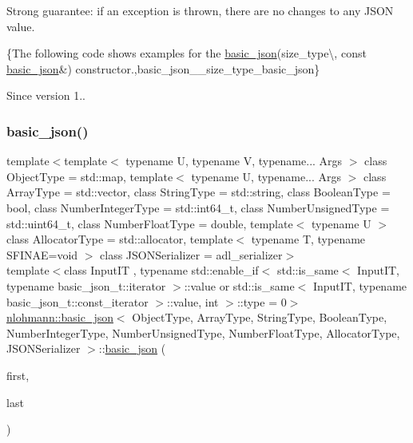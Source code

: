 Strong guarantee\+: if an exception is thrown, there are no changes to any J\+S\+ON value.

\{The following code shows examples for the \mbox{\hyperlink{classnlohmann_1_1basic__json}{basic\+\_\+json}}(size\+\_\+type\textbackslash{}, const \mbox{\hyperlink{classnlohmann_1_1basic__json}{basic\+\_\+json}}\&) constructor.,basic\+\_\+json\+\_\+\+\_\+size\+\_\+type\+\_\+basic\+\_\+json\}

\begin{DoxySince}{Since}
version 1.. 
\end{DoxySince}
\mbox{\label{classnlohmann_1_1basic__json_abe197e9f3184487805cfb5bba6fd5938}} 
\subsubsection{\texorpdfstring{basic\+\_\+json()}{basic\_json()}\hspace{0.1cm}{\footnotesize\ttfamily [7/9]}}
{\footnotesize\ttfamily template$<$template$<$ typename U, typename V, typename... Args $>$ class Object\+Type = std\+::map, template$<$ typename U, typename... Args $>$ class Array\+Type = std\+::vector, class String\+Type  = std\+::string, class Boolean\+Type  = bool, class Number\+Integer\+Type  = std\+::int64\+\_\+t, class Number\+Unsigned\+Type  = std\+::uint64\+\_\+t, class Number\+Float\+Type  = double, template$<$ typename U $>$ class Allocator\+Type = std\+::allocator, template$<$ typename T, typename S\+F\+I\+N\+A\+E=void $>$ class J\+S\+O\+N\+Serializer = adl\+\_\+serializer$>$ \\
template$<$class Input\+IT , typename std\+::enable\+\_\+if$<$ std\+::is\+\_\+same$<$ Input\+I\+T, typename basic\+\_\+json\+\_\+t\+::iterator $>$\+::value or std\+::is\+\_\+same$<$ Input\+I\+T, typename basic\+\_\+json\+\_\+t\+::const\+\_\+iterator $>$\+::value, int $>$\+::type  = 0$>$ \\
\mbox{\hyperlink{classnlohmann_1_1basic__json}{nlohmann\+::basic\+\_\+json}}$<$ Object\+Type, Array\+Type, String\+Type, Boolean\+Type, Number\+Integer\+Type, Number\+Unsigned\+Type, Number\+Float\+Type, Allocator\+Type, J\+S\+O\+N\+Serializer $>$\+::\mbox{\hyperlink{classnlohmann_1_1basic__json}{basic\+\_\+json}} (\begin{DoxyParamCaption}\item[{Input\+IT}]{first,  }\item[{Input\+IT}]{last }\end{DoxyParamCaption})\hspace{0.3cm}{\ttfamily [inline]}}



